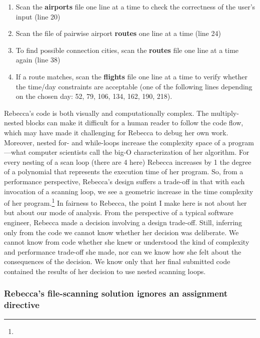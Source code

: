 \begin{enumerate}
\def\labelenumi{\arabic{enumi}.}
\item
  Scan the \textbf{airports} file one line at a time to check the
  correctness of the user's input (line 20)
\item
  Scan the file of pairwise airport \textbf{routes} one line at a time
  (line 24)
\item
  To find possible connection cities, scan the \textbf{routes} file one
  line at a time again (line 38)
\item
  If a route matches, scan the \textbf{flights} file one line at a time
  to verify whether the time/day constraints are acceptable (one of the
  following lines depending on the chosen day: 52, 79, 106, 134, 162,
  190, 218).
\end{enumerate}

Rebecca's code is both visually and computationally complex. The
multiply-nested blocks can make it difficult for a human reader to
follow the code flow, which may have made it challenging for Rebecca to
debug her own work. Moreover, nested for- and while-loops increase the
complexity space of a program---what computer scientists call the big-O
characterization of her algorithm. For every nesting of a scan loop
(there are 4 here) Rebecca increases by 1 the degree of a polynomial
that represents the execution time of her program. So, from a
performance perspective, Rebecca's design suffers a trade-off in that
with each invocation of a scanning loop, we see a geometric increase in
the time complexity of her program.\footnote{} In fairness to Rebecca,
the point I make here is not about her but about our mode of analysis.
From the perspective of a typical software engineer, Rebecca made a
decision involving a design trade-off. Still, inferring only from the
code we cannot know whether her decision was deliberate. We cannot know
from code whether she knew or understood the kind of complexity and
performance trade-off she made, nor can we know how she felt about the
consequences of the decision. We know only that her final submitted code
contained the results of her decision to use nested scanning loops.

\subsubsection{Rebecca's file-scanning solution ignores an assignment
directive
}\label{rebeccas-file-scanning-solution-ignores-an-assignment-directive}

